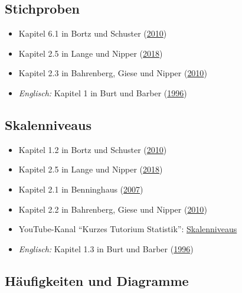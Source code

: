 \documentclass[
  11pt,
  ngerman,
  a4paper,
]{report}
\providecommand{\tightlist}{%
  \setlength{\itemsep}{0pt}\setlength{\parskip}{0pt}}
\begin{document}
\hypertarget{stichproben}{%
\subsection{Stichproben}\label{stichproben}}

\begin{itemize}
\tightlist
\item
  Kapitel 6.1 in Bortz und Schuster (\protect\hyperlink{ref-bortz}{2010})
\item
  Kapitel 2.5 in Lange und Nipper (\protect\hyperlink{ref-delange}{2018})
\item
  Kapitel 2.3 in Bahrenberg, Giese und Nipper (\protect\hyperlink{ref-bahrenberg}{2010})
\item
  \emph{Englisch:} Kapitel 1 in Burt und Barber (\protect\hyperlink{ref-burt}{1996})
\end{itemize}

\hypertarget{skalenniveaus-1}{%
\subsection{Skalenniveaus}\label{skalenniveaus-1}}

\begin{itemize}
\tightlist
\item
  Kapitel 1.2 in Bortz und Schuster (\protect\hyperlink{ref-bortz}{2010})
\item
  Kapitel 2.5 in Lange und Nipper (\protect\hyperlink{ref-delange}{2018})
\item
  Kapitel 2.1 in Benninghaus (\protect\hyperlink{ref-benninghaus}{2007})
\item
  Kapitel 2.2 in Bahrenberg, Giese und Nipper (\protect\hyperlink{ref-bahrenberg}{2010})
\item
  YouTube-Kanal \enquote{Kurzes Tutorium Statistik}: \href{https://www.youtube.com/watch?v=TV4tTtW4UBU}{Skalenniveaus}
\item
  \emph{Englisch:} Kapitel 1.3 in Burt und Barber (\protect\hyperlink{ref-burt}{1996})
\end{itemize}

\hypertarget{huxe4ufigkeiten-und-diagramme}{%
\subsection{Häufigkeiten und Diagramme}\label{huxe4ufigkeiten-und-diagramme}}
\end{document}
